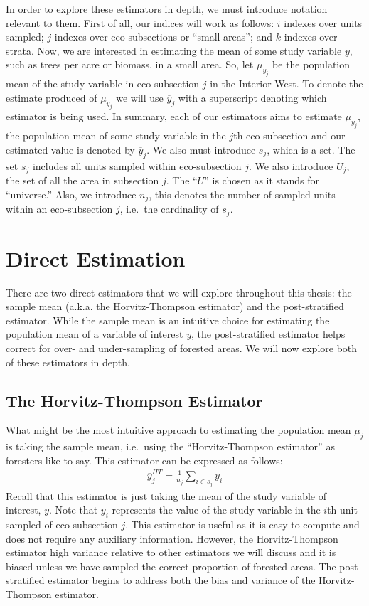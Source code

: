 \documentclass[12pt,twoside]{reedthesis}
\begin{document}
In order to explore these estimators in depth, we must introduce notation relevant to them. First of all, our indices will work as follows: \(i\) indexes over units sampled; \(j\) indexes over eco-subsections or ``small areas''; and \(k\) indexes over strata. Now, we are interested in estimating the mean of some study variable \(y\), such as trees per acre or biomass, in a small area. So, let \(\mu_{y_j}\) be the population mean of the study variable in eco-subsection \(j\) in the Interior West. To denote the estimate produced of \(\mu_{y_j}\) we will use \(\overline y_j\) with a superscript denoting which estimator is being used. In summary, each of our estimators aims to estimate \(\mu_{y_j}\), the population mean of some study variable in the \(j\)th eco-subsection and our estimated value is denoted by \(\overline y_j\). We also must introduce \(s_j\), which is a set. The set \(s_j\) includes all units sampled within eco-subsection \(j\). We also introduce \(U_j\), the set of all the area in subsection \(j\). The ``\(U\)'' is chosen as it stands for ``universe.'' Also, we introduce \(n_j\), this denotes the number of sampled units within an eco-subsection \(j\), i.e.~the cardinality of \(s_j\).

\hypertarget{direct-estimation}{%
\section{Direct Estimation}\label{direct-estimation}}

There are two direct estimators that we will explore throughout this thesis: the sample mean (a.k.a. the Horvitz-Thompson estimator) and the post-stratified estimator. While the sample mean is an intuitive choice for estimating the population mean of a variable of interest \(y\), the post-stratified estimator helps correct for over- and under-sampling of forested areas. We will now explore both of these estimators in depth.

\hypertarget{the-horvitz-thompson-estimator}{%
\subsection{The Horvitz-Thompson Estimator}\label{the-horvitz-thompson-estimator}}

What might be the most intuitive approach to estimating the population mean \(\mu_j\) is taking the sample mean, i.e.~using the ``Horvitz-Thompson estimator'' as foresters like to say. This estimator can be expressed as follows:
\begin{align}
\overline y_j^{HT} = \frac{1}{n_j} \sum_{i \in s_j} y_i 
\end{align}
Recall that this estimator is just taking the mean of the study variable of interest, \(y\). Note that \(y_i\) represents the value of the study variable in the \(i\)th unit sampled of eco-subsection \(j\). This estimator is useful as it is easy to compute and does not require any auxiliary information. However, the Horvitz-Thompson estimator high variance relative to other estimators we will discuss and it is biased unless we have sampled the correct proportion of forested areas. The post-stratified estimator begins to address both the bias and variance of the Horvitz-Thompson estimator.
\end{document}
